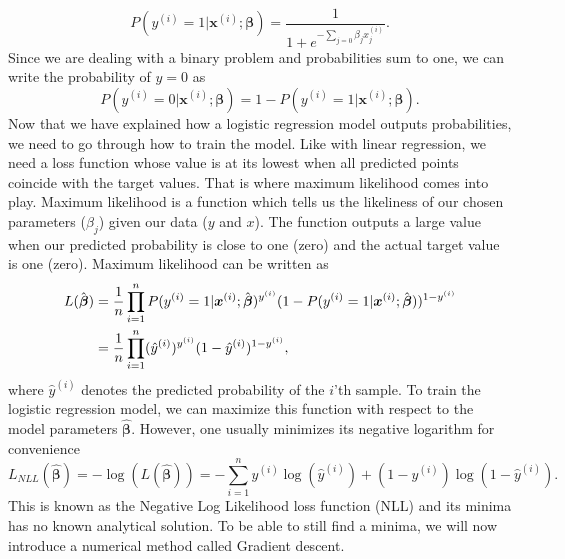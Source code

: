 \begin{equation}
    \label{eq:LogRegProbyisone}
     P(y^{(i)}=1|\boldsymbol{x}^{(i)};\boldsymbol{\beta}) = \frac{1}{1 + e^{-\sum_{j=0}\beta_j x^{(i)}_j}}.
\end{equation}
Since we are dealing with a binary problem and probabilities sum to one, we can write the probability of $y = 0$ as
\begin{equation}
    \label{eq:LogRegProbyiszero}
    P(y^{(i)}=0|\boldsymbol{x}^{(i)};\boldsymbol{\beta}) = 1 - P(y^{(i)}=1|\boldsymbol{x}^{(i)};\boldsymbol{\beta}).
\end{equation}
Now that we have explained how a logistic regression model outputs probabilities, we need to go through how to train the model. Like with linear regression, we need a loss function whose value is at its lowest when all predicted points coincide with the target values. That is where maximum likelihood comes into play. Maximum likelihood is a function which tells us the likeliness of our chosen parameters ($\beta_j$) given our data ($y$ and $x$). The function outputs a large value when our predicted probability is close to one (zero) and the actual target value is one (zero). Maximum likelihood can be written as \cite{handsonml}
\begin{align}
    \label{eq:MaximumLikelihood}
    L (\hat{\boldsymbol{\beta}}) &= \frac{1}{n}\prod_{i=1}^n P(y^{(i)} = 1|\boldsymbol{x}^{(i)}; \hat{\boldsymbol{\beta}})^{y^{(i)}}(1 - P(y^{(i)}=1|\boldsymbol{x}^{(i)};\hat{\boldsymbol{\beta}}))^{1-y^{(i)}} \notag \\
    &= \frac{1}{n}\prod_{i=1}^n (\hat{y}^{(i)})^{y^{(i)}}(1 - \hat{y}^{(i)})^{1-y^{(i)}},
\end{align}
where $\hat{y}^{(i)}$ denotes the predicted probability of the $i$'th sample. To train the logistic regression model, we can maximize this function with respect to the model parameters $\boldsymbol{\hat{\beta}}$. However, one usually minimizes its negative logarithm for convenience
\begin{equation}
    \label{eq:NegativeLogLikelihood}
    L_{NLL}(\hat{\boldsymbol{\beta}}) = -\log (L (\hat{\boldsymbol{\beta}})) = -\sum_{i=1}^n y^{(i)} \log (\hat{y}^{(i)}) + (1 - y^{(i)}) \log (1 - \hat{y}^{(i)}).
\end{equation}
This is known as the Negative Log Likelihood loss function (NLL) and its minima has no known analytical solution. To be able to still find a minima, we will now introduce a numerical method called Gradient descent.

